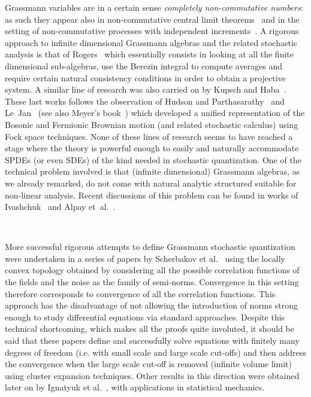 \documentclass{article}
\newcommand{\tmtextit}[1]{{\itshape{#1}}}
\begin{document}
Grassmann variables are in a certain sense \tmtextit{completely
non-commutative numbers}: as such they appear also in non-commutative central
limit theorems~{\cite{von_waldenfels_non_commutative_1986}} and in the setting
of non-commutative processes with independent
increments~{\cite{schurman_quantum_1991,bozejko_interpolations_1996}}. A
rigorous approach to infinite dimensional Grassmann algebras and the related
stochastic analysis is that of
Rogers~{\cite{rogers_graded_1986,rogers_stochastic_1992_I,rogers_stochastic_1992_II,rogers_path_1995,leppard_feynman_kac_2001}}
which essentially consists in looking at all the finite dimensional
sub-algebras, use the Berezin integral to compute averages and require certain
natural consistency conditions in order to obtain a projective system. A
similar line of research was also carried on by Kupsch and
Haba~{\cite{kupsch_fermionic_1993,haba_supersymmetry_1995}}. These last works
follows the observation of Hudson and
Parthasarathy~{\cite{hudson_unification_1986}} and
Le~Jan~{\cite{le_jan_temps_1987}} (see also Meyer's book~{\cite{Meyerbook}})
which developed a unified representation of the Bosonic and Fermionic Brownian
motion (and related stochastic calculus) using Fock space techniques. None of
these lines of research seems to have reached a stage where the theory is
powerful enough to easily and naturally accommodate SPDEs (or even SDEs) of
the kind needed in stochastic quantization. One of the technical problem
involved is that (infinite dimensional) Grassmann algebras, as we already
remarked, do not come with natural analytic structured suitable for non-linear
analysis. Recent discussions of this problem can be found in works of
Ivashchuk~{\cite{ivashchuk_infinite_dimensional_2000}} and Alpay
et~al.~{\cite{alpay_distribution_2019}}.

\

More successful rigorous attempts to define Grassmann stochastic quantization
were undertaken in a series of papers by Scherbakov et
al.~{\cite{shcherbakov_elements_1993,shcherbakov_elements_1993-1,shcherbakov_elements_1993-2}}
using the locally convex topology obtained by considering all the possible
correlation functions of the fields and the noise as the family of semi-norms.
Convergence in this setting therefore corresponds to convergence of all the
correlation functions. This approach has the disadvantage of not allowing the
introduction of norms strong enough to study differential equations via
standard approaches. Despite this technical shortcoming, which makes all the
proofs quite involuted, it should be said that these papers define and
successfully solve equations with finitely many degrees of freedom (i.e. with
small scale and large scale cut-offs) and then address the convergence when
the large scale cut-off is removed (infinite volume limit) using cluster
expansion techniques. Other results in this direction were obtained later on
by Ignatyuk et al.~{\cite{ignatyuk_convergence_1993}}, with applications in
statistical mechanics.
\end{document}

